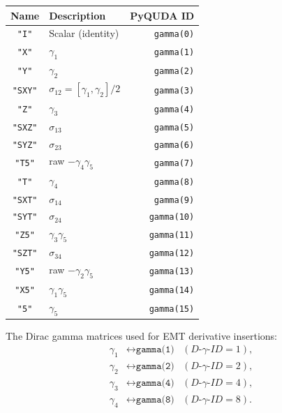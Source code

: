 \documentclass[11pt,a4paper]{article}
\begin{document}
\begin{center}
\begin{tabular}{clr}
\toprule
Name & Description & PyQUDA ID \\
\midrule
\texttt{"I"}  & Scalar (identity)      & \texttt{gamma(0)}  \\
\texttt{"X"}  & $\gamma_{1}$           & \texttt{gamma(1)}  \\
\texttt{"Y"}  & $\gamma_{2}$           & \texttt{gamma(2)}  \\
\texttt{"SXY"}& $\sigma_{12}=[\gamma_{1},\gamma_{2}]/2$ & \texttt{gamma(3)} \\
\texttt{"Z"}  & $\gamma_{3}$           & \texttt{gamma(4)}  \\
\texttt{"SXZ"}& $\sigma_{13}$          & \texttt{gamma(5)}  \\
\texttt{"SYZ"}& $\sigma_{23}$          & \texttt{gamma(6)}  \\
\texttt{"T5"} & raw $-\gamma_{4}\gamma_{5}$ & \texttt{gamma(7)}  \\
\texttt{"T"}  & $\gamma_{4}$           & \texttt{gamma(8)}  \\
\texttt{"SXT"}& $\sigma_{14}$          & \texttt{gamma(9)}  \\
\texttt{"SYT"}& $\sigma_{24}$          & \texttt{gamma(10)} \\
\texttt{"Z5"} & $\gamma_{3}\gamma_{5}$ & \texttt{gamma(11)} \\
\texttt{"SZT"}& $\sigma_{34}$          & \texttt{gamma(12)} \\
\texttt{"Y5"} & raw $-\gamma_{2}\gamma_{5}$ & \texttt{gamma(13)} \\
\texttt{"X5"} & $\gamma_{1}\gamma_{5}$ & \texttt{gamma(14)} \\
\texttt{"5"}  & $\gamma_{5}$           & \texttt{gamma(15)} \\
\bottomrule
\end{tabular}
\end{center}

\noindent
The Dirac gamma matrices used for EMT derivative insertions:
\begin{align}
  \gamma_{1} &\leftrightarrow \texttt{gamma(1)}  & (D\text{-}\gamma\text{-}ID = 1),\\
  \gamma_{2} &\leftrightarrow \texttt{gamma(2)}  & (D\text{-}\gamma\text{-}ID = 2),\\
  \gamma_{3} &\leftrightarrow \texttt{gamma(4)}  & (D\text{-}\gamma\text{-}ID = 4),\\
  \gamma_{4} &\leftrightarrow \texttt{gamma(8)}  & (D\text{-}\gamma\text{-}ID = 8).
\end{align}
\end{document}
